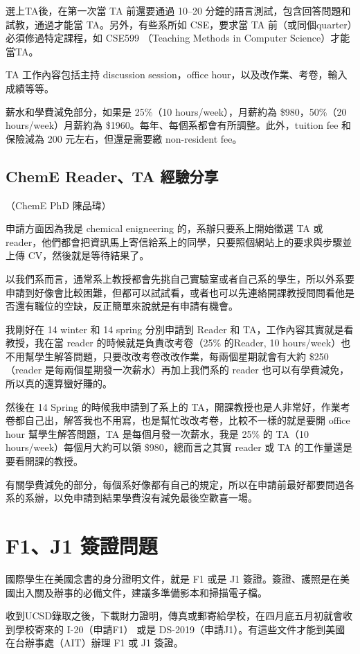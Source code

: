 \documentclass[10pt,a4paper]{book}
\begin{document}
\begin{CJK}{UTF8}{bkai}
選上TA後，在第一次當 TA 前還要通過 10--20 分鐘的語言測試，包含回答問題和試教，通過才能當 TA。另外，有些系所如 CSE，要求當 TA 前（或同個quarter）必須修過特定課程，如 CSE599 （Teaching Methods in Computer Science）才能當TA。

TA 工作內容包括主持 discussion session，office hour，以及改作業、考卷，輸入成績等等。

薪水和學費減免部分，如果是 25\%（10 hours/week），月薪約為 \$980，50\%（20 hours/week）月薪約為 \$1960。每年、每個系都會有所調整。此外，tuition fee 和保險減為 200 元左右，但還是需要繳 non-resident fee。

\subsection{ChemE Reader、TA 經驗分享}
 （ChemE PhD 陳品瑋）
 
申請方面因為我是 chemical enigneering 的，系辦只要系上開始徵選 TA 或 reader，他們都會把資訊馬上寄信給系上的同學，只要照個網站上的要求與步驟並上傳 CV，然後就是等待結果了。

以我們系而言，通常系上教授都會先挑自己實驗室或者自己系的學生，所以外系要申請到好像會比較困難，但都可以試試看，或者也可以先連絡開課教授問問看他是否還有職位的空缺，反正簡單來說就是有申請有機會。

我剛好在 14 winter 和 14 spring 分別申請到 Reader 和 TA，工作內容其實就是看教授，我在當 reader 的時候就是負責改考卷（25\% 的Reader, 10 hours/week）也不用幫學生解答問題，只要改改考卷改改作業，每兩個星期就會有大約 \$250 （reader 是每兩個星期發一次薪水）再加上我們系的 reader 也可以有學費減免，所以真的還算蠻好賺的。

然後在 14 Spring 的時候我申請到了系上的 TA，開課教授也是人非常好，作業考卷都自己出，解答我也不用寫，也是幫忙改改考卷，比較不一樣的就是要開 office hour 幫學生解答問題，TA 是每個月發一次薪水，我是 25\% 的 TA（10 hours/week）每個月大約可以領 \$980，總而言之其實 reader 或 TA 的工作量還是要看開課的教授。

有關學費減免的部分，每個系好像都有自己的規定，所以在申請前最好都要問過各系的系辦，以免申請到結果學費沒有減免最後空歡喜一場。

\section{F1、J1 簽證問題}
\label{sec:visa}
國際學生在美國念書的身分證明文件，就是 F1 或是 J1 簽證。簽證、護照是在美國出入關及辦事的必備文件，建議多準備影本和掃描電子檔。

收到UCSD錄取之後，下載財力證明，傳真或郵寄給學校，在四月底五月初就會收到學校寄來的 I-20（申請F1） 或是 DS-2019（申請J1）。有這些文件才能到美國在台辦事處（AIT）辦理 F1 或 J1 簽證。


\end{CJK}
\end{document}
